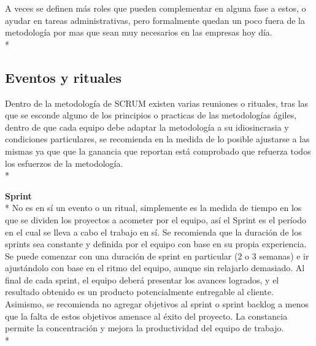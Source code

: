 \documentclass[../pfc.tex]{subfiles}
\begin{document}
	A veces se definen más roles que pueden complementar en alguna fase a estos, o ayudar en tareas administrativas, pero formalmente quedan un poco fuera de la metodología por mas que sean muy necesarios en las empresas hoy día.\\*
	
	\subsection{Eventos y rituales}
	
	Dentro de la metodología de SCRUM existen varias reuniones o rituales, tras las que se esconde alguno de los principios o practicas de las metodologías ágiles\cite{agile}, dentro de que cada equipo debe adaptar la metodología a su idiosincrasia y condiciones particulares, se recomienda en la medida de lo posible ajustarse a las mismas ya que que la ganancia que reportan está comprobado que refuerza todos los esfuerzos de la metodología.\\* 
		
	\textbf{Sprint}\\* 
	No es en sí un evento o un ritual, simplemente es la medida de tiempo en los que se dividen los proyectos a acometer por el equipo, así el Sprint es el período en el cual se lleva a cabo el trabajo en sí. Se recomienda que la duración de los sprints sea constante y definida por el equipo con base en su propia experiencia. Se puede comenzar con una duración de sprint en particular (2 o 3 semanas) e ir ajustándolo con base en el ritmo del equipo, aunque sin relajarlo demasiado. Al final de cada sprint, el equipo deberá presentar los avances logrados, y el resultado obtenido es un producto potencialmente entregable al cliente. Asimismo, se recomienda no agregar objetivos al sprint o sprint backlog a menos que la falta de estos objetivos amenace al éxito del proyecto. La constancia permite la concentración y mejora la productividad del equipo de trabajo.\\*
	
\end{document}
